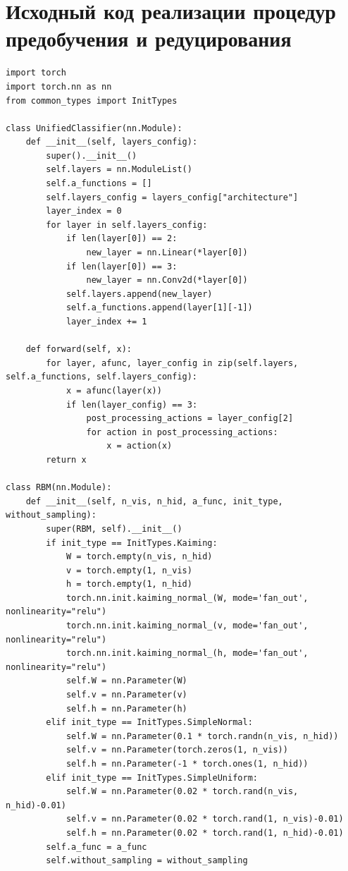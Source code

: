 \chapter{Исходный код реализации процедур предобучения и редуцирования}
\label{app:a}

\begin{lstlisting}[style=PythonStyle]
import torch
import torch.nn as nn
from common_types import InitTypes

class UnifiedClassifier(nn.Module):
    def __init__(self, layers_config):
        super().__init__()
        self.layers = nn.ModuleList()
        self.a_functions = []
        self.layers_config = layers_config["architecture"]
        layer_index = 0
        for layer in self.layers_config:
            if len(layer[0]) == 2:
                new_layer = nn.Linear(*layer[0])
            if len(layer[0]) == 3:
                new_layer = nn.Conv2d(*layer[0])
            self.layers.append(new_layer)
            self.a_functions.append(layer[1][-1])
            layer_index += 1

    def forward(self, x):
        for layer, afunc, layer_config in zip(self.layers, self.a_functions, self.layers_config):
            x = afunc(layer(x))
            if len(layer_config) == 3:
                post_processing_actions = layer_config[2]
                for action in post_processing_actions:
                    x = action(x)
        return x

class RBM(nn.Module):
    def __init__(self, n_vis, n_hid, a_func, init_type, without_sampling):
        super(RBM, self).__init__()
        if init_type == InitTypes.Kaiming:
            W = torch.empty(n_vis, n_hid)
            v = torch.empty(1, n_vis)
            h = torch.empty(1, n_hid)
            torch.nn.init.kaiming_normal_(W, mode='fan_out', nonlinearity="relu")
            torch.nn.init.kaiming_normal_(v, mode='fan_out', nonlinearity="relu")
            torch.nn.init.kaiming_normal_(h, mode='fan_out', nonlinearity="relu")
            self.W = nn.Parameter(W)
            self.v = nn.Parameter(v)
            self.h = nn.Parameter(h)
        elif init_type == InitTypes.SimpleNormal:
            self.W = nn.Parameter(0.1 * torch.randn(n_vis, n_hid))
            self.v = nn.Parameter(torch.zeros(1, n_vis))
            self.h = nn.Parameter(-1 * torch.ones(1, n_hid))
        elif init_type == InitTypes.SimpleUniform:
            self.W = nn.Parameter(0.02 * torch.rand(n_vis, n_hid)-0.01)
            self.v = nn.Parameter(0.02 * torch.rand(1, n_vis)-0.01)
            self.h = nn.Parameter(0.02 * torch.rand(1, n_hid)-0.01)
        self.a_func = a_func
        self.without_sampling = without_sampling


\end{lstlisting}

